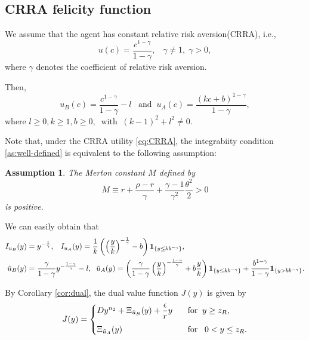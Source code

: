 \documentclass[a4paper,report, 11pt]{article}
\newtheorem{as}{Assumption}
\def\e{\epsilon}
\def\g{\gamma}
\def\t{\theta}
\begin{document}
{\subsection{CRRA felicity function}

We assume that the agent has constant relative risk aversion(CRRA), i.e.,
\begin{equation}\label{eq:CRRA}
u(c)=\dfrac{c^{1-\g}}{1-\g},\;\;\;\g\ne 1,\;\g>0,
\end{equation}	
where $\g$ denotes the coefficient of relative risk aversion.

Then, 
\begin{equation*}
u_B(c)=\dfrac{c^{1-\g}}{1-\g}-l\;\;\;\mbox{and}\;\;u_A(c)=\dfrac{(kc+b)^{1-\g}}{1-\g},
\end{equation*}
where $l \geq 0, k\geq 1, b\geq 0, \;\;\mbox{with}\;\;{(k-1)^2+l^2\ne 0}$. 

Note that, under the CRRA utility \eqref{eq:CRRA}, the integrabiity condition \eqref{as:well-defined} is equivalent to the following assumption:
\begin{as}\label{as:Merton} The Merton constant $M$ defined by 
\begin{equation}
M\equiv r+\dfrac{\rho-r}{\g} +\dfrac{\g-1}{\g^2}\dfrac{\t^2}{2}>0
\end{equation}	
is positive. 
\end{as}

We can easily obtain that
\begin{align*}
I_{u_B}(y)&=y^{-\frac{1}{\g}},\;\;\;I_{u_A}(y)=\dfrac{1}{k}\left(\left(\dfrac{y}{k}\right)^{-\frac{1}{\g}}-b\right){\bf 1}_{\{y\le kb^{-\g} \}},\vspace{2mm}\\
\tilde{u}_B(y)&=\dfrac{\g}{1-\g}y^{-\frac{1-\g}{\g}}-l,\;\;\tilde{u}_A(y)=\left(\dfrac{\g}{1-\g}\left(\dfrac{y}{k}\right)^{-\frac{1-\g}{\g}}+b\dfrac{y}{k}\right){\bf 1}_{\{y\le k b^{-\g} \}} +\dfrac{b^{1-\g}}{1-\g}{\bf 1}_{\{y>k b^{-\g}\}}.\nonumber
\end{align*}

By Corollary \ref{cor:dual}, the dual value function $J(y)$ is given by 
\begin{align*}
J(y)=
\begin{cases}
Dy^{n_2}+\Xi_{\tilde{u}_B}(y)+\dfrac{\e}{r}y\;\;\;&\mbox{for}\;\;y\ge z_R,\vspace{2mm}\\
\Xi_{\tilde{u}_A}(y)\;\;\;&\mbox{for}\;\;\;0<y\le z_R.
\end{cases}
\end{align*}

}
\end{document}
